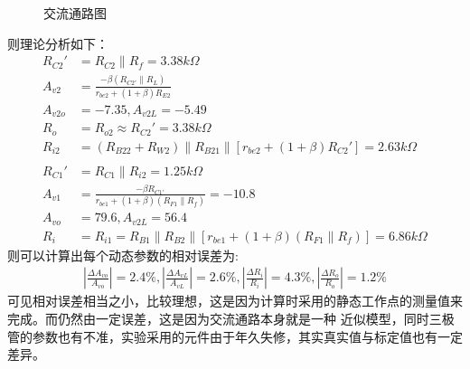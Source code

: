 \documentclass[a4paper,11pt,UTF8]{ctexart}
\begin{document}
    \begin{figure}[htbp]
      \centering
      \caption{交流通路图}
      \label{fig:ACModel}
      \end{figure}
    则理论分析如下：
    \begin{equation}
      \begin{aligned}
        R_{C2}'&=R_{C2}\parallel R_f=3.38k\Omega\\
        A_{v2}&=\frac{-\beta (R_{C2'}\parallel R_L)}{r_{be2}+(1+\beta)R_{E2}}\\
        A_{v2o}&=-7.35,A_{v2L}=-5.49\\
        R_o&=R_{o2}\approx R_{C2}'=3.38k\Omega\\
        R_{i2}&=(R_{B22}+R_{W2})\parallel R_{B21}\parallel [r_{be2}+(1+\beta)R_{C2}']= 2.63k\Omega\\
        &\,\\
        R_{C1}'&=R_{C1}\parallel R_{i2}=1.25k\Omega\\
        A_{v1}&=\frac{-\beta R_{C1'}}{r_{be1}+(1+\beta)(R_{F1}\parallel R_{f})}=-10.8\\
        A_{vo}&=79.6,A_{v2L}=56.4\\
        R_{i}&=R_{i1}=R_{B1}\parallel R_{B2}\parallel[r_{be1}+(1+\beta)(R_{F1}\parallel R_{f})]=6.86k\Omega
      \end{aligned}
    \end{equation}
    则可以计算出每个动态参数的相对误差为:
    \begin{equation}
      \begin{aligned}
        \left |\frac{\Delta A_{vo}}{A_{vo}}\right |=2.4\%,
        \left |\frac{\Delta A_{vL}}{A_{vL}}\right |=2.6\%,
        \left |\frac{\Delta R_{i}}{R_{i}}\right |=4.3\%,
        \left |\frac{\Delta R_{o}}{R_{o}}\right |=1.2\%
      \end{aligned}
    \end{equation}
    可见相对误差相当之小，比较理想，这是因为计算时采用的静态工作点的测量值来完成。而仍然由一定误差，这是因为交流通路本身就是一种
    近似模型，同时三极管的参数也有不准，实验采用的元件由于年久失修，其实真实值与标定值也有一定差异。
\end{document}
